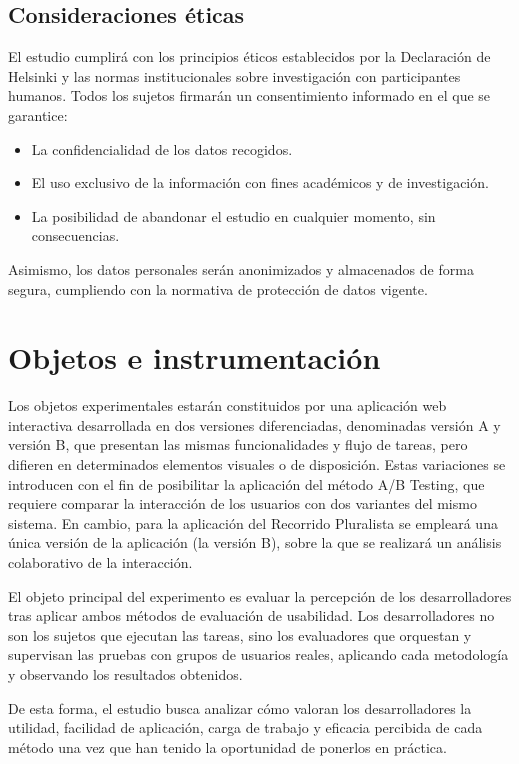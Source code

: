 \documentclass[a4paper,12pt]{report}
\begin{document}
\subsection*{Consideraciones éticas}
El estudio cumplirá con los principios éticos establecidos por la Declaración de Helsinki y las normas institucionales sobre investigación con participantes humanos. Todos los sujetos firmarán un consentimiento informado en el que se garantice:
\begin{itemize}
    \item La confidencialidad de los datos recogidos.
    \item El uso exclusivo de la información con fines académicos y de investigación.
    \item La posibilidad de abandonar el estudio en cualquier momento, sin consecuencias.
\end{itemize}
Asimismo, los datos personales serán anonimizados y almacenados de forma segura, cumpliendo con la normativa de protección de datos vigente.

\section{Objetos e instrumentación}

Los objetos experimentales estarán constituidos por una aplicación web interactiva desarrollada en dos versiones diferenciadas, 
denominadas versión A y versión B, que presentan las mismas funcionalidades y flujo de tareas, pero difieren en determinados elementos visuales o de disposición. 
Estas variaciones se introducen con el fin de posibilitar la aplicación del método A/B Testing, que requiere comparar la interacción de los usuarios con dos variantes del mismo sistema.
En cambio, para la aplicación del Recorrido Pluralista se empleará una única versión de la aplicación (la versión B), 
sobre la que se realizará un análisis colaborativo de la interacción.

El objeto principal del experimento es evaluar la percepción de los desarrolladores 
tras aplicar ambos métodos de evaluación de usabilidad. 
Los desarrolladores no son los sujetos que ejecutan las tareas, 
sino los evaluadores que orquestan y supervisan las pruebas con grupos de usuarios reales, 
aplicando cada metodología y observando los resultados obtenidos.

De esta forma, el estudio busca analizar cómo valoran los desarrolladores la utilidad, 
facilidad de aplicación, carga de trabajo y eficacia percibida de cada método una vez que han tenido la oportunidad de ponerlos en práctica.
\end{document}
